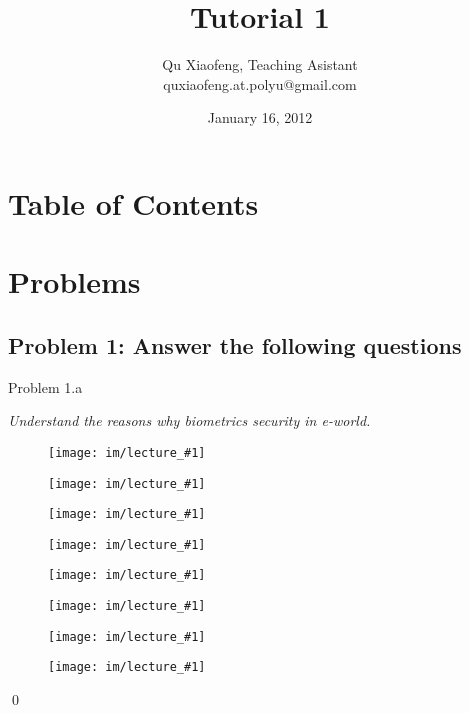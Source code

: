 \documentclass[
        ]{beamer}
\title{Tutorial 1}
\author[COMP435p]{Qu Xiaofeng\texorpdfstring{, Teaching Asistant\\\tiny{quxiaofeng.at.polyu@gmail.com}}{}}
\institute{COMP435p\\Biometrics Authentication}
\date{January 16, 2012}
\begin{document}
\newcommand{\inupdf}[2]{\begin{figure}\centering\texttt{[image: im/lecture\_\#1]}\end{figure}}
\newcommand{\inlpdf}[2]{\begin{figure}\centering\texttt{[image: im/lecture\_\#1]}\end{figure}}
\newcommand{\inpng}[1]{\begin{figure}\centering\texttt{[image: im/\#1]}\end{figure}}

\frame{\titlepage}

\section*{Table of Contents}

    \begin{frame}{\secname}
        \tableofcontents
    \end{frame}





\section{Problems}
    \subsection{Problem 1: Answer the following questions}
        \begin{frame}[c]{Problem 1.a}    		
    				\begin{overprint}
            		\emph{Understand the reasons why biometrics security in e-world.}
                \inlpdf{1}{2}
                \inupdf{1}{3}
                \inlpdf{1}{3}
                \inupdf{1}{4}
                \inlpdf{1}{4}
                \inupdf{1}{5}
                \inlpdf{1}{5}
                \inupdf{1}{6}\qed
            \end{overprint}            
        \end{frame}
        
\end{document}
